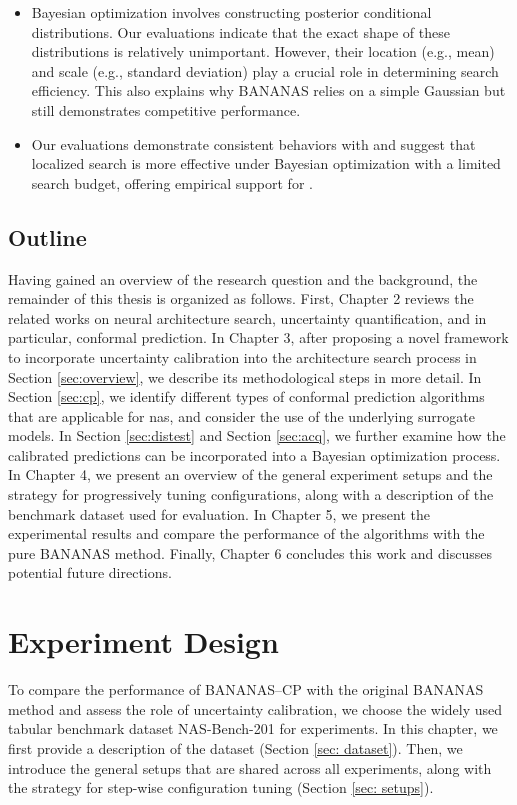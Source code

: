 \documentclass[a4paper,oneside,bibliography=totoc]{scrbook}
\begin{document}
	\begin{itemize}
    \item Bayesian optimization involves constructing posterior conditional distributions. Our evaluations indicate that the exact shape of these distributions is relatively unimportant. However, their location (e.g., mean) and scale (e.g., standard deviation) play a crucial role in determining search efficiency. This also explains why BANANAS relies on a simple Gaussian but still demonstrates competitive performance.
    \item Our evaluations demonstrate consistent behaviors with \cite{white2019bananas} and suggest that localized search is more effective under Bayesian optimization with a limited search budget, offering empirical support for \cite{nomura2019simple}. 
    \end{itemize}

\section{Outline}
Having gained an overview of the research question and the background, the remainder of this thesis is organized as follows. First, Chapter 2 reviews the related works on neural architecture search, uncertainty quantification, and in particular, conformal prediction. In Chapter 3, after proposing a novel framework to incorporate uncertainty calibration into the architecture search process in Section \ref{sec:overview}, we describe its methodological steps in more detail. In Section \ref{sec:cp}, we identify different types of conformal prediction algorithms that are applicable for \gls{nas}, and consider the use of the underlying surrogate models. In Section \ref{sec:distest} and Section \ref{sec:acq}, we further examine how the calibrated predictions can be incorporated into a Bayesian optimization process. In Chapter 4, we present an overview of the general experiment setups and the strategy for progressively tuning configurations, along with a description of the benchmark dataset used for evaluation. In Chapter 5, we present the experimental results and compare the performance of the algorithms with the pure BANANAS method. Finally, Chapter 6 concludes this work and discusses potential future directions.  





\chapter{Experiment Design}
\label{ch4}
To compare the performance of BANANAS--CP with the original BANANAS method and assess the role of uncertainty calibration, we choose the widely used tabular benchmark dataset NAS-Bench-201 \cite{dong2020nasbench201} for experiments. In this chapter, we first provide a description of the dataset (Section \ref{sec: dataset}). Then, we introduce the general setups that are shared across all experiments, along with the strategy for step-wise configuration tuning  (Section \ref{sec: setups}).
\end{document}
